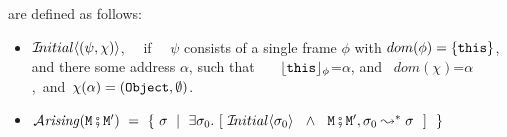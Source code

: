 \begin{definition} are defined as follows: \label{defn:iniial-and-arising}

\begin{itemize}
     \item
   ${{\mathcal I}\!nitial}\langle(\psi,\chi)\rangle$, \ \ if \ \ $\psi$ consists of a single frame $\phi$ with $dom(\phi)=\{ {\mbox{\tt{this}}} \}$, and there  some address $\alpha$, such that \ \ \    ${\lfloor{ {{\mbox{\tt{this}}}}}\rfloor_{\phi}}$=$\alpha$, and \ $dom(\chi)$=$\alpha$,\  and\  
    $\chi(\alpha)=({\mbox{\tt{Object}}},\emptyset)$.
 \item
 $\Arising  {\M\mkpair\M'} \ = \ \{ \ \sigma \ \mid \ \exists \sigma_0. \ [\  \Initial{\sigma_0} \  \ \wedge\ \  \M\mkpair\M', \sigma_0 \leadsto^* \sigma \ \ ] \ \ \} $
 \end{itemize}

\end{definition}

